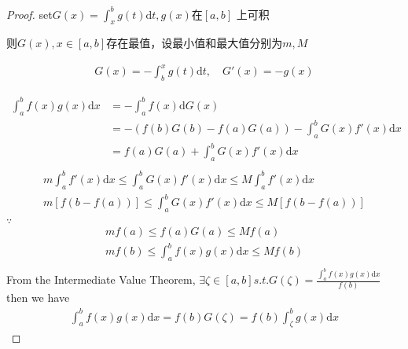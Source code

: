 \documentclass[10pt,a4paper]{book}
\begin{document}
\begin{proof}
	set$ G(x) = \int_{x}^{b}g(t)\text{d}t , g(x)\text{在}[a,b] $	上可积

	则$ G(x),x\in [a,b] $存在最值，设最小值和最大值分别为$ m,M $
	
	\begin{gather}
		G(x) = -\int_{b}^{x}g(t)\text{d}t,\quad  G'(x) = -g(x)
	\end{gather}

\begin{equation}
	\begin{aligned}
		\int_{a}^{b}f(x)g(x)\text{d}x &= -\int_{a}^{b}f(x)\text{d}G(x)\\
		&=-{(f(b)G(b) - f(a)G(a)) -\int_{a}^{b}G(x)f'(x)\text{d}x }\\
		&= f(a)G(a)+ \int_{a}^{b}G(x)f'(x)\text{d}x\\
	\end{aligned}
\end{equation}
	\begin{gather}
		m\int_{a}^{b}f'(x)\text{d}x \le \int_{a}^{b} G(x)f'(x)\text{d}x \le M\int_{a}^{b}f'(x)\text{d}x\\
		m[f(b-f(a))] \le  \int_{a}^{b} G(x)f'(x)\text{d}x \le M[f(b-f(a))]\\
	\end{gather}
$ \because $
	\begin{gather}
		mf(a) \le  f(a)G(a) \le Mf(a)\\	
		mf(b) \le  \int_{a}^{b} f(x)g(x) \text{d}x \le Mf(b)\\	
	\end{gather}
	From the Intermediate Value Theorem, $ \exists \zeta \in [a,b] s.t. G(\zeta) = \frac{\int_{a}^{b}f(x)g(x)\text{d}x}{f(b)} $\\
	then we have
	\begin{gather}
		\int_{a}^{b}f(x)g(x)\text{d}x = f(b)G(\zeta) = f(b)\int_{\zeta}^{b}g(x)\text{d}x
	\end{gather}
	
	
\end{proof}
\end{document}
